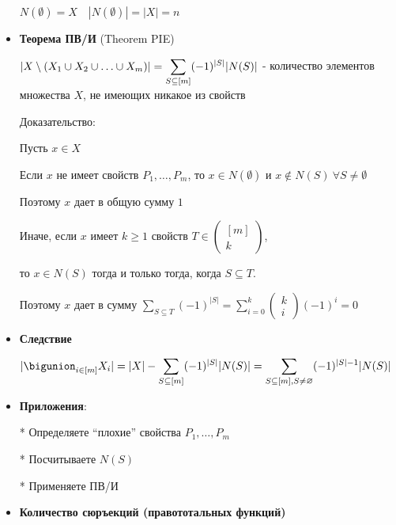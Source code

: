 \documentclass[12pt]{article}
\begin{document}
\begin{itemize}
        $N(\emptyset) = X \quad |N(\emptyset)| = |X| = n$

        \vspace{5mm}
        \item \textbf{Теорема ПВ/И} (Theorem PIE)

        $\displaystyle |X \setminus (X_1 \union X_2 \union \dots \union X_m)| = \sum_{S \subseteq [m]} (-1)^{|S|} |N(S)|$ - количество элементов множества $X$, не имеющих никакое из свойств

        Доказательство:

        Пусть $x \in X$

        Если $x$ не имеет свойств $\displaystyle P_1,\dots,P_m$, то $x \in N(\emptyset)$ и $x \notin N(S) \ \forall S \neq \emptyset$

        Поэтому $x$ дает в общую сумму $1$

        Иначе, если $x$ имеет $k \geq 1$ свойств $T \in \begin{pmatrix} [m] \\ k\end{pmatrix}$,

        то $x \in N(S)$ тогда и только тогда, когда $S \subseteq T$.

        Поэтому $x$ дает в сумму $\displaystyle \sum_{S \subseteq T} (-1)^{|S|} = \sum_{i = 0}^k \begin{pmatrix} k \\ i \end{pmatrix} (-1)^i = 0$

        \vspace{5mm}
        \item \textbf{Следствие}

        $\displaystyle |\bigunion_{i \in [m]} X_i| = |X| - \sum_{S \subseteq [m]} (-1)^{|S|} |N(S)| = \sum_{S \subseteq [m], S \neq \emptyset} (-1)^{|S| - 1} |N(S)|$

        \vspace{5mm}
        \item \textbf{Приложения}:

        * Определяете \enquote{плохие} свойства $\displaystyle P_1, \dots, P_m$

        * Посчитываете $N(S)$

        * Применяете ПВ/И

        \vspace{5mm}
        \item \textbf{Количество сюръекций (правототальных функций)}


\end{itemize}
\end{document}
